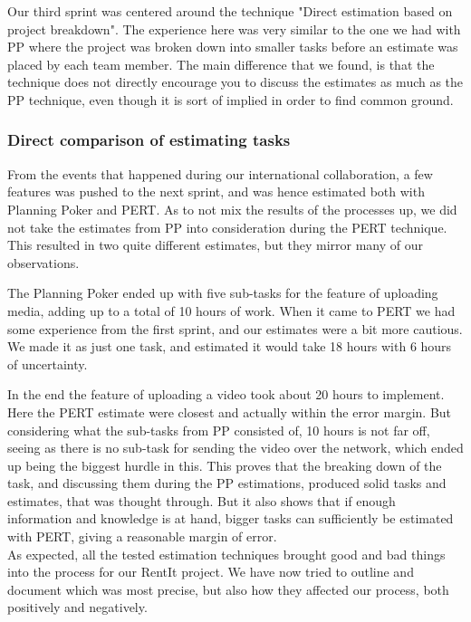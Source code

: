 Our third sprint was centered around the technique "Direct estimation based on project breakdown". The experience here was very similar to the one we had with PP where the project was broken down into smaller tasks before an estimate was placed by each team member. The main difference that we found, is that the technique does not directly encourage you to discuss the estimates as much as the PP technique, even though it is sort of implied in order to find common ground.\\

\subsubsection{Direct comparison of estimating tasks}
From the events that happened during our international collaboration, a few features was pushed to the next sprint, and was hence estimated both with Planning Poker and PERT. As to not mix the results of the processes up, we did not take the estimates from PP into consideration during the PERT technique. This resulted in two quite different estimates, but they mirror many of our observations.

The Planning Poker ended up with five sub-tasks for the feature of uploading media, adding up to a total of 10 hours of work. When it came to PERT we had some experience from the first sprint, and our estimates were a bit more cautious. We made it as just one task, and estimated it would take 18 hours with 6 hours of uncertainty.

In the end the feature of uploading a video took about 20 hours to implement. Here the PERT estimate were closest and actually within the error margin. But considering what the sub-tasks from PP consisted of, 10 hours is not far off, seeing as there is no sub-task for sending the video over the network, which ended up being the biggest hurdle in this. This proves that the breaking down of the task, and discussing them during the PP estimations, produced solid tasks and estimates, that was thought through. But it also shows that if enough information and knowledge is at hand, bigger tasks can sufficiently be estimated with PERT, giving a reasonable margin of error. \\


As expected, all the tested estimation techniques brought good and bad things into the process for our RentIt project. We have now tried to outline and document which was most precise, but also how they affected our process, both positively and negatively.

